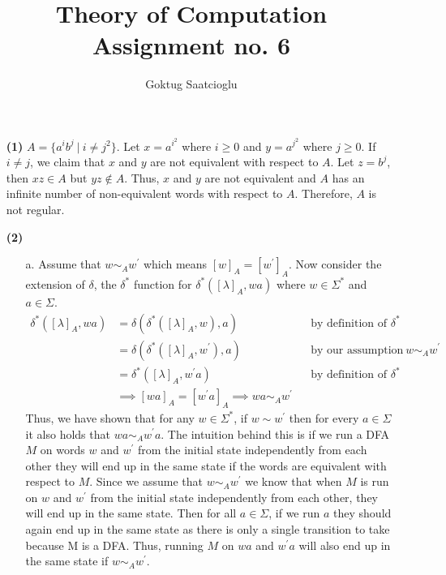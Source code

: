 \documentclass [10pt]{article}
\begin{document}
\title{Theory of Computation Assignment no. 6}
\author{Goktug Saatcioglu}
\date{}
\maketitle

\begin{enumerate}
	\item[\textbf{(1)}]$A = \{a^{i}b^{j}\:|\:i\ne j^{2}\}$. Let $x = a^{i^{2}}$ where $i \ge 0$ and $y = a^{j^{2}}$ where $j \ge 0$. If $i \ne j$, we claim that $x$ and $y$ are not equivalent with respect to $A$. Let $z = b^{j}$, then $xz \in A$ but $yz \notin A$. Thus, $x$ and $y$ are not equivalent and $A$ has an infinite number of non-equivalent words with respect to $A$. Therefore, $A$ is not regular. 
	\item[\textbf{(2)}]
	\begin{enumerate}
		\item[a.]Assume that $w \sim_{A} w^{\prime}$ which means $[w]_{A}=[w^{\prime}]_{A}$. Now consider the extension of $\delta$, the $\delta^{*}$ function for $\delta^{*}([\lambda]_{A},wa)$ where $w\in\Sigma^{*}$ and $a\in\Sigma$.
		\begin{align}
			\delta^{*}([\lambda]_{A},wa) &= \delta(\delta^{*}([\lambda]_{A},w),a) && \text{by definition of $\delta^{*}$} \nonumber \\
			&= \delta(\delta^{*}([\lambda]_{A},w^{\prime}),a) && \text{by our assumption that $w \sim_{A} w^{\prime}$} \nonumber \\
			&= \delta^{*}([\lambda]_{A},w^{\prime}a) && \text{by definition of $\delta^{*}$} \nonumber \\
			&\implies [wa]_{A} = [w^{\prime}a]_{A} \implies wa \sim_{A} w^{\prime} \nonumber
		\end{align}
		Thus, we have shown that for any $w\in\Sigma^{*}$, if $w\sim w^{\prime}$ then for every $a\in\Sigma$ it also holds that $wa\sim_{A}w^{\prime}a$. The intuition behind this is if we run a DFA $M$ on words $w$ and $w^{\prime}$ from the initial state independently from each other they will end up in the same state if the words are equivalent with respect to $M$. Since we assume that $w \sim_{A} w^{\prime}$ we know that when $M$ is run on $w$ and $w^{\prime}$ from the initial state independently from each other, they will end up in the same state. Then for all $a\in\Sigma$, if we run $a$ they should again end up in the same state as there is only a single transition to take because M is a DFA. Thus, running $M$ on $wa$ and $w^{\prime}a$ will also end up in the same state if $w\sim_{A}w^{\prime}$.

\end{enumerate}
\end{enumerate}
\end{document}
